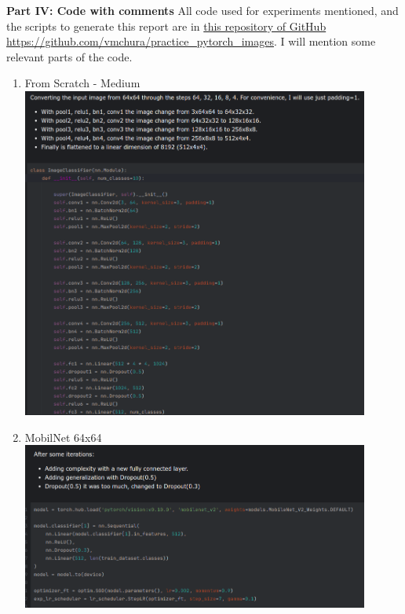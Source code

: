 \documentclass{cpsc202}
\begin{document}
    \large\textbf{Part IV: Code with comments}
    All code used for experiments mentioned, and the scripts to generate this report are in \href{https://github.com/vmchura/practice_pytorch_images}{this repository of GitHub https://github.com/vmchura/practice\_pytorch\_images}.
    I will mention some relevant parts of the code.
    \begin{enumerate}
        \item From Scratch - Medium \\
        \includegraphics[width=0.9\textwidth]{scratch_medium}
        \item MobilNet 64x64 \\
        \includegraphics[width=0.9\textwidth]{mobilnet64}
    \end{enumerate}
\end{document}
